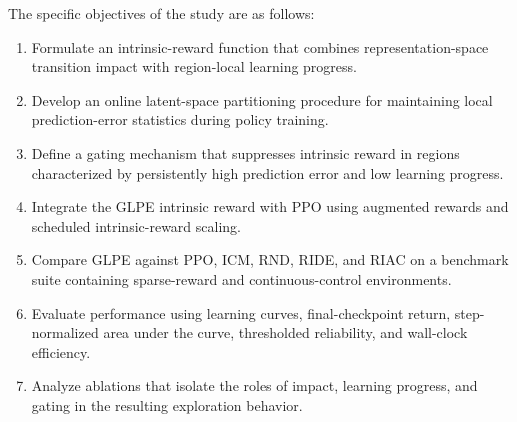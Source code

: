 The specific objectives of the study are as follows:

\begin{enumerate}
    \item Formulate an intrinsic-reward function that combines representation-space transition impact with region-local learning progress.
    \item Develop an online latent-space partitioning procedure for maintaining local prediction-error statistics during policy training.
    \item Define a gating mechanism that suppresses intrinsic reward in regions characterized by persistently high prediction error and low learning progress.
    \item Integrate the GLPE intrinsic reward with PPO using augmented rewards and scheduled intrinsic-reward scaling.
    \item Compare GLPE against PPO, ICM, RND, RIDE, and RIAC on a benchmark suite containing sparse-reward and continuous-control environments.
    \item Evaluate performance using learning curves, final-checkpoint return, step-normalized area under the curve, thresholded reliability, and wall-clock efficiency.
    \item Analyze ablations that isolate the roles of impact, learning progress, and gating in the resulting exploration behavior.
\end{enumerate}